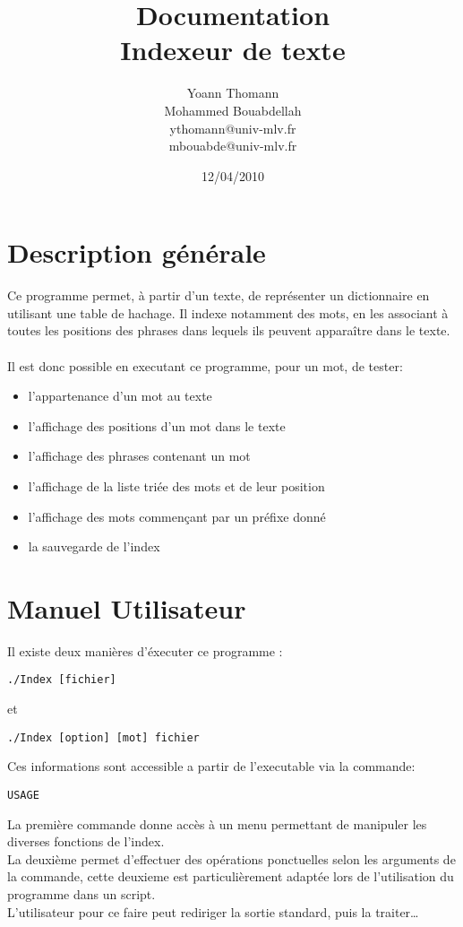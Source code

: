 \documentclass[french, 12pt, titlepage]{article}
\author{Yoann Thomann\\Mohammed Bouabdellah\\\scriptsize ythomann@univ-mlv.fr\\\scriptsize mbouabde@univ-mlv.fr}
\date{12/04/2010}
\title{\Huge Documentation\\Indexeur de texte}
\begin{document}
\vspace{\fill}
\maketitle
\newpage
\tableofcontents
\newpage
\section{Description générale}
Ce programme permet, à partir d'un texte, de représenter un
dictionnaire en utilisant une table de hachage. Il indexe notamment
des mots, en les associant à toutes les positions des phrases dans
lequels ils peuvent apparaître dans le texte. \\\\
Il est donc possible en executant ce programme, pour un mot, de
tester:
\begin{itemize}
\renewcommand{\labelitemi}{$\bullet$}
\item l'appartenance d'un mot au texte
\item l'affichage des positions d'un mot dans le texte
\item l'affichage des phrases contenant un mot
\item l'affichage de la liste triée des mots et de leur position
\item l'affichage des mots commençant par un préfixe donné
\item la sauvegarde de l'index
\end{itemize}

\section{Manuel Utilisateur}
Il existe deux manières d'éxecuter ce programme :
\begin{lstlisting}
./Index [fichier]
\end{lstlisting}
et
\begin{lstlisting}
./Index [option] [mot] fichier
\end{lstlisting}
Ces informations sont accessible a partir de l'executable via la
commande:
\begin{lstlisting}
USAGE
\end{lstlisting}
La première commande donne accès à un menu permettant de manipuler les
diverses fonctions de l'index.\\
La deuxième permet d'effectuer des opérations ponctuelles selon les
arguments de la commande, cette deuxieme est particulièrement adaptée
lors de l'utilisation du programme dans un script.\\
L'utilisateur pour ce faire peut rediriger la sortie standard, puis la
traiter\dots
\end{document}
